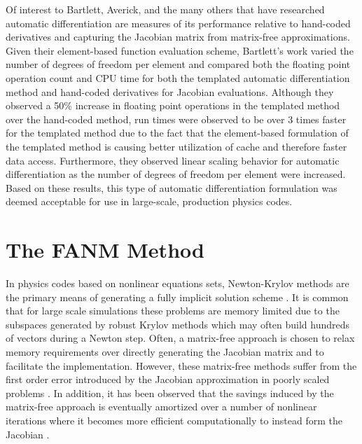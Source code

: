 Of interest to Bartlett, Averick, and the many others that have
researched automatic differentiation are measures of its performance
relative to hand-coded derivatives and capturing the Jacobian matrix
from matrix-free approximations. Given their element-based function
evaluation scheme, Bartlett's work varied the number of degrees of
freedom per element and compared both the floating point operation
count and CPU time for both the templated automatic differentiation
method and hand-coded derivatives for Jacobian evaluations. Although
they observed a 50\% increase in floating point operations in the
templated method over the hand-coded method, run times were observed
to be over 3 times faster for the templated method due to the fact
that the element-based formulation of the templated method is causing
better utilization of cache and therefore faster data
access. Furthermore, they observed linear scaling behavior for
automatic differentiation as the number of degrees of freedom per
element were increased. Based on these results, this type of automatic
differentiation formulation was deemed acceptable for use in
large-scale, production physics codes.

\section{The FANM Method\ }
\label{sec:fanm}
In physics codes based on nonlinear equations sets, Newton-Krylov
methods are the primary means of generating a fully implicit
solution scheme
\cite{evans_development_2006,evans_enhanced_2007,gaston_parallel_2009,godoy_parallel_2012}. It
is common that for large scale simulations these problems are memory
limited due to the subspaces generated by robust Krylov methods which
may often build hundreds of vectors during a Newton step. Often, a
matrix-free approach is chosen to relax memory requirements over
directly generating the Jacobian matrix and to facilitate the
implementation. However, these matrix-free methods suffer from the
first order error introduced by the Jacobian approximation in poorly
scaled problems \citep{kelley_iterative_1995}. In addition, it has
been observed that the savings induced by the matrix-free approach is
eventually amortized over a number of nonlinear iterations where it
becomes more efficient computationally to instead form the Jacobian
\citep{knoll_newton-krylov_1995}.


